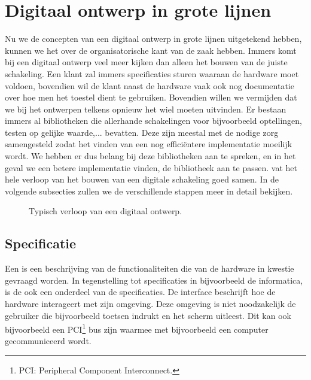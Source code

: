\section{Digitaal ontwerp in grote lijnen}
Nu we de concepten van een digitaal ontwerp in grote lijnen uitgetekend hebben, kunnen we het over de organisatorische kant van de zaak hebben. Immers komt bij een digitaal ontwerp veel meer kijken dan alleen het bouwen van de juiste schakeling. Een klant zal immers specificaties sturen waaraan de hardware moet voldoen, bovendien wil de klant naast de hardware vaak ook nog documentatie over hoe men het toestel dient te gebruiken. Bovendien willen we vermijden dat we bij het ontwerpen telkens opnieuw het wiel moeten uitvinden. Er bestaan immers al bibliotheken die allerhande schakelingen voor bijvoorbeeld optellingen, testen op gelijke waarde,... bevatten. Deze zijn meestal met de nodige zorg samengesteld zodat het vinden van een nog effici\"entere implementatie moeilijk wordt. We hebben er dus belang bij deze bibliotheken aan te spreken, en in het geval we een betere implementatie vinden, de bibliotheek aan te passen.  vat het hele verloop van het bouwen van een digitale schakeling goed samen. In de volgende subsecties zullen we de verschillende stappen meer in detail bekijken.
\begin{figure}
\centering
{}
\caption{Typisch verloop van een digitaal ontwerp.}
\end{figure}

\subsection{Specificatie}
Een  is een beschrijving van de functionaliteiten die van de hardware in kwestie gevraagd worden. In tegenstelling tot specificaties in bijvoorbeeld de informatica, is de  ook een onderdeel van de specificaties. De interface beschrijft hoe de hardware interageert met zijn omgeving. Deze omgeving is niet noodzakelijk de gebruiker die bijvoorbeeld toetsen indrukt en het scherm uitleest. Dit kan ook bijvoorbeeld een PCI\footnote{PCI: Peripheral Component Interconnect.} bus zijn waarmee met bijvoorbeeld een computer gecommuniceerd wordt.

